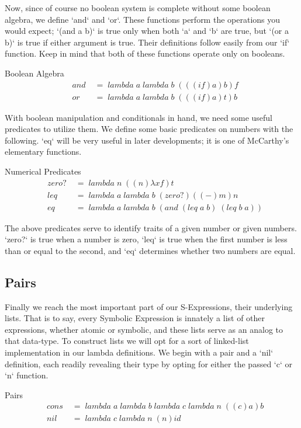 Now, since of course no boolean system is complete without some boolean algebra, 
we define `and` and `or`. These functions perform the operations you would expect; 
`(and a b)` is true only when both `a` and `b` are true, but `(or a b)` is true if 
either argument is true. Their definitions follow easily from our `if` function. 
Keep in mind that both of these functions operate only on booleans.

Boolean Algebra
\begin{align*}
& and \; &= \; lambda \; a \; lambda \; b \; (((if)a)b)f
\\& or \; &= \; lambda \; a \; lambda \; b \; (((if)a)t)b
\end{align*}

With boolean manipulation and conditionals in hand, we need some useful predicates 
to utilize them. We define some basic predicates on numbers with the following. 
`eq` will be very useful in later developments; it is one of McCarthy's elementary 
functions.

Numerical Predicates
\begin{align*}
& zero? \; &= \; lambda \; n \; ((n)λxf)t
\\& leq \; &= \; lambda \; a \; lambda \; b \; (zero?)((-)m)n
\\& eq \; &= \; lambda \; a \; lambda \; b \; (and \; (leq \; a \; b) \; (leq \; b \; a))
\end{align*}

The above predicates serve to identify traits of a given number or given numbers. 
`zero?` is true when a number is zero, `leq` is true when the first number is less 
than or equal to the second, and `eq` determines whether two numbers are equal.

\subsection{Pairs}
Finally we reach the most important part of our S-Expressions, their underlying 
lists. That is to say, every Symbolic Expression is innately a list of other 
expressions, whether atomic or symbolic, and these lists serve as an analog to 
that data-type. To construct lists we will opt for a sort of linked-list 
implementation in our lambda definitions. We begin with a pair and a `nil` 
definition, each readily revealing their type by opting for either the passed `c` 
or `n` function.

Pairs
\begin{align*}
& cons \; &= \; lambda \; a \; lambda \; b \; lambda \; c \; lambda \; n \; ((c)a)b
\\& nil \; &= \; lambda \; c \; lambda \; n \; (n)id
\end{align*}

